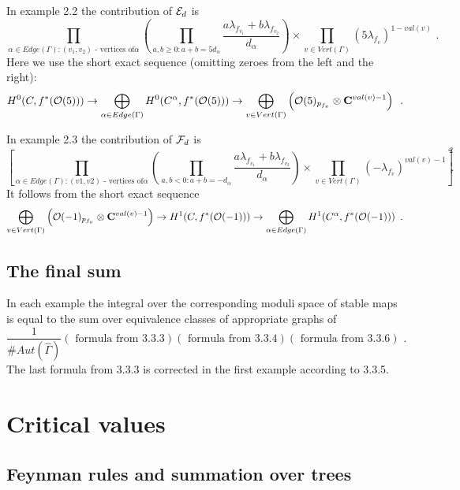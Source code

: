 \documentclass{amsart}
\begin{document}
In  example 2.2 the contribution of $\mathcal E_d$ is
$$\prod_{\alpha\in Edge(\Gamma):(v_1,v_2)\text{ -  vertices of
}\alpha}\left(\prod_{a,b\ge 0:
a+b=5d_{\alpha}}\frac{a\lambda_{f_{v_1}}+b\lambda_{f_{v_2}}}{d_{\alpha}}\right)\times
\prod_{v\in Vert(\Gamma)}(5\lambda_{f_v})^{1-val(v)}\,\,.$$
Here we use the short exact sequence (omitting zeroes from the left and the
right):
$$H^0(C,f^*(\mathcal O (5)))\to\displaystyle\bigoplus_{\alpha\in Edge(\Gamma)}
H^0(C^{\alpha},f^*(\mathcal O (5)))\to\bigoplus_{v\in Vert (\Gamma)}
\left(\mathcal O(5)_{p_{f_v}}\otimes \mathbf C^{val(v)-1}\right)\,\,\,.$$

In  example 2.3 the contribution of $\mathcal F_d$ is
$$\left[\prod_{\alpha\in Edge (\Gamma): (v1,v2)\text{ - vertices of
}\alpha}\left(
\prod_{a,b<0:a+b=-d_{\alpha}}
\frac{a\lambda_{f_{v_1}}+b\lambda_{f_{v_2}}}
{d_{\alpha}}
\right)\times\prod_{v\in Vert (\Gamma)}
(-\lambda_{f_v})^{val(v)-1}\right]^2\,.$$
 It follows from the short exact sequence
$$\bigoplus_{v\in Vert (\Gamma)}
\left(\mathcal O(-1)_{p_{f_v}}\otimes \mathbf C^{val(v)-1}\right)\to H^1(C,f^*(\mathcal O
(-1)))\to\displaystyle\bigoplus_{\alpha\in Edge(\Gamma)}
H^1(C^{\alpha},f^*(\mathcal O (-1)))
\,\,\,.$$

\subsection{The final sum}


In each example the integral over the corresponding moduli space of stable maps
 is equal to the sum over equivalence classes of appropriate graphs
 of
$$\frac{1}{\# Aut(\widehat\Gamma)}(\text{ formula from 3.3.3})(\text{ formula
from 3.3.4})(\text{ formula from 3.3.6})\,\,.$$
The last formula from 3.3.3 is corrected in the first example according to
3.3.5.





\section{Critical values}

\subsection{Feynman rules and summation over trees}
\end{document}
